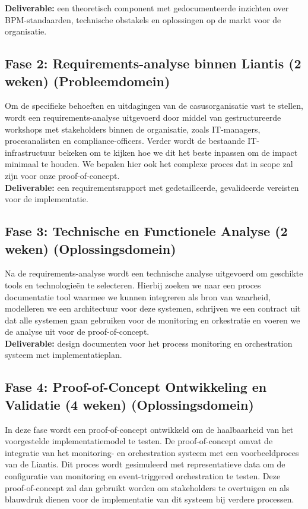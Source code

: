 \textbf{Deliverable:} een theoretisch component met gedocumenteerde inzichten over BPM-standaarden, technische obstakels en oplossingen op de markt voor de organisatie.

\subsection{Fase 2: Requirements-analyse binnen Liantis (2 weken) (Probleemdomein)}

Om de specifieke behoeften en uitdagingen van de casusorganisatie vast te stellen, wordt een requirements-analyse uitgevoerd door middel van gestructureerde workshops met stakeholders binnen de organisatie, zoals IT-managers, procesanalisten en compliance-officers. Verder wordt de bestaande IT-infrastructuur bekeken om te kijken hoe we dit het beste inpassen om de impact minimaal te houden. We bepalen hier ook het complexe proces dat in scope zal zijn voor onze proof-of-concept. \\

\textbf{Deliverable:} een requirementsrapport met gedetailleerde, gevalideerde vereisten voor de implementatie.

\subsection{Fase 3: Technische en Functionele Analyse (2 weken) (Oplossingsdomein)}

Na de requirements-analyse wordt een technische analyse uitgevoerd om geschikte tools en technologieën te selecteren. Hierbij zoeken we naar een proces documentatie tool waarmee we kunnen integreren als bron van waarheid, modelleren we een architectuur voor deze systemen, schrijven we een contract uit dat alle systemen gaan gebruiken voor de monitoring en orkestratie en voeren we de analyse uit voor de proof-of-concept.  \\

\textbf{Deliverable:} design documenten voor het process monitoring en orchestration systeem met implementatieplan.

\subsection{Fase 4: Proof-of-Concept Ontwikkeling en Validatie (4 weken) (Oplossingsdomein)}

In deze fase wordt een proof-of-concept ontwikkeld om de haalbaarheid van het voorgestelde implementatiemodel te testen. De proof-of-concept omvat de integratie van het monitoring- en orchestration systeem met een voorbeeldproces van de Liantis. Dit proces wordt gesimuleerd met representatieve data om de configuratie van monitoring en event-triggered orchestration te testen. Deze proof-of-concept zal dan gebruikt worden om stakeholders te overtuigen en als blauwdruk dienen voor de implementatie van dit systeem bij verdere processen. \\

